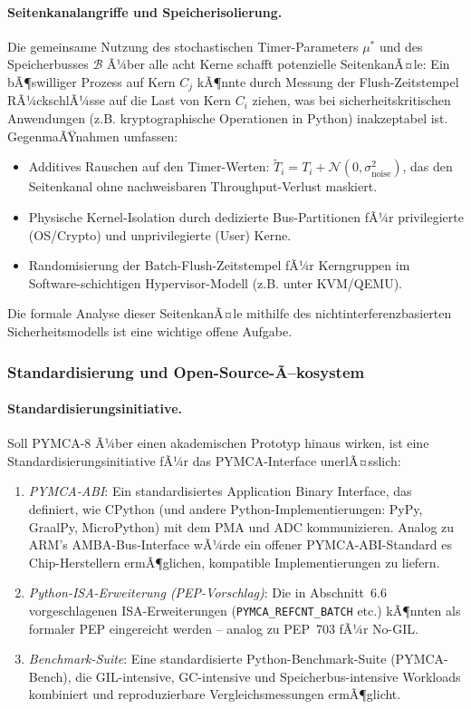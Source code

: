 ﻿\documentclass[a4paper,12pt]{scrreprt}
\theoremstyle{definition}
\begin{document}
	\paragraph{Seitenkanalangriffe und Speicherisolierung.}
	Die gemeinsame Nutzung des stochastischen Timer-Parameters $\mu^*$ und des
	Speicherbusses $\mathcal{B}$ Ã¼ber alle acht Kerne schafft potenzielle
	SeitenkanÃ¤le: Ein bÃ¶swilliger Prozess auf Kern $C_j$ kÃ¶nnte durch Messung
	der Flush-Zeitstempel RÃ¼ckschlÃ¼sse auf die Last von Kern $C_i$ ziehen,
	was bei sicherheitskritischen Anwendungen (z.B. kryptographische Operationen
	in Python) inakzeptabel ist. GegenmaÃŸnahmen umfassen:
	\begin{itemize}[noitemsep]
		\item Additives Rauschen auf den Timer-Werten: $\tilde{T}_i = T_i + \mathcal{N}(0, \sigma_{\mathrm{noise}}^2)$,
		das den Seitenkanal ohne nachweisbaren Throughput-Verlust maskiert.
		\item Physische Kernel-Isolation durch dedizierte Bus-Partitionen fÃ¼r
		privilegierte (OS/Crypto) und unprivilegierte (User) Kerne.
		\item Randomisierung der Batch-Flush-Zeitstempel fÃ¼r Kerngruppen im
		Software-schichti\-gen Hypervisor-Modell (z.B. unter KVM/QEMU).
	\end{itemize}
	Die formale Analyse dieser SeitenkanÃ¤le mithilfe des nichtinterferenzbasierten
	Sicherheitsmodells \cite{sleator1985amortized} ist eine wichtige offene Aufgabe.

	\subsubsection{Standardisierung und Open-Source-Ã–kosystem}

	\paragraph{Standardisierungsinitiative.}
	Soll PYMCA-8 Ã¼ber einen akademischen Prototyp hinaus wirken, ist eine
	Standardisierungsinitiative fÃ¼r das PYMCA-Interface unerlÃ¤sslich:
	\begin{enumerate}[noitemsep]
		\item \emph{PYMCA-ABI}: Ein standardisiertes Application Binary Interface,
		das definiert, wie CPython (und andere Python-Implementierungen: PyPy,
		GraalPy, MicroPython) mit dem PMA und ADC kommunizieren. Analog zu
		ARM's AMBA-Bus-Interface wÃ¼rde ein offener PYMCA-ABI-Standard es
		Chip-Herstellern ermÃ¶glichen, kompatible Implementierungen zu liefern.
		\item \emph{Python-ISA-Erweiterung (PEP-Vorschlag)}: Die in Abschnitt~6.6
		vorgeschlagenen ISA-Erweiterungen (\texttt{PYMCA\_REFCNT\_BATCH} etc.)
		kÃ¶nnten als formaler PEP eingereicht werden -- analog zu PEP~703 fÃ¼r No-GIL.
		\item \emph{Benchmark-Suite}: Eine standardisierte Python-Benchmark-Suite
		(PYMCA-Bench), die GIL-intensive, GC-intensive und Speicherbus-intensive
		Workloads kombiniert und reproduzierbare Vergleichsmessungen ermÃ¶glicht.
	\end{enumerate}
\end{document}

